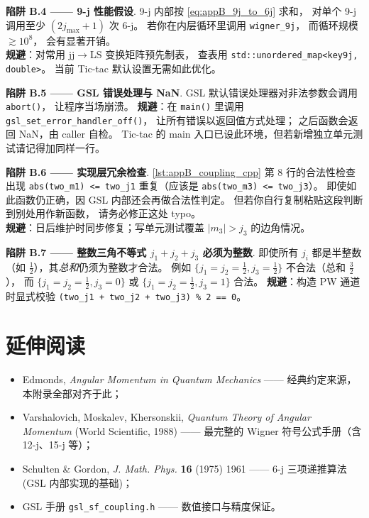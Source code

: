 \begin{pitfallbox}
\textbf{陷阱 B.4 —— 9-j 性能假设}.
9-j 内部按 \cref{eq:appB_9j_to_6j} 求和，
对单个 9-j 调用至少 $(2 j_{\mathrm{max}}+1)$ 次 6-j。
若你在内层循环里调用 \texttt{wigner\_9j}，
而循环规模 $\gtrsim 10^{8}$，
会有显著开销。\\
\textbf{规避}：对常用 jj$\to$LS 变换矩阵预先制表，
查表用 \texttt{std::unordered\_map<key9j, double>}。
当前 Tic-tac 默认设置无需如此优化。
\end{pitfallbox}

\begin{pitfallbox}
\textbf{陷阱 B.5 —— GSL 错误处理与 NaN}.
GSL 默认错误处理器对非法参数会调用 \texttt{abort()}，
让程序当场崩溃。
\textbf{规避}：在 \texttt{main()} 里调用 \texttt{gsl\_set\_error\_handler\_off()}，
让所有错误以返回值方式处理；
之后函数会返回 NaN，由 caller 自检。
Tic-tac 的 main 入口已设此环境，但若新增独立单元测试请记得加同样一行。
\end{pitfallbox}

\begin{pitfallbox}
\textbf{陷阱 B.6 —— 实现层冗余检查}.
\cref{lst:appB_coupling_cpp} 第 8 行的合法性检查
出现 \texttt{abs(two\_m1) <= two\_j1} 重复（应该是 \texttt{abs(two\_m3) <= two\_j3}）。
即使如此函数仍正确，因 GSL 内部还会再做合法性判定。
但若你自行复制粘贴这段判断到别处用作新函数，
请务必修正这处 typo。\\
\textbf{规避}：日后维护时同步修复；写单元测试覆盖 $|m_3| > j_3$ 的边角情况。
\end{pitfallbox}

\begin{pitfallbox}
\textbf{陷阱 B.7 —— 整数三角不等式 $j_1 + j_2 + j_3$ 必须为整数}.
即使所有 $j_i$ 都是半整数（如 $\tfrac{1}{2}$），其\emph{总和}仍须为整数才合法。
例如 $\{j_1=j_2=\tfrac{1}{2}, j_3=\tfrac{1}{2}\}$ 不合法（总和 $\tfrac{3}{2}$），
而 $\{j_1=j_2=\tfrac{1}{2}, j_3=0\}$ 或 $\{j_1=j_2=\tfrac{1}{2}, j_3=1\}$ 合法。
\textbf{规避}：构造 PW 通道时显式校验
\texttt{(two\_j1 + two\_j2 + two\_j3) \% 2 == 0}。
\end{pitfallbox}

\section{延伸阅读}
\label{sec:appB_further_reading}

\begin{itemize}
\item Edmonds, \emph{Angular Momentum in Quantum Mechanics}\cite{Edmonds1957} ——
      经典约定来源，本附录全部对齐于此；
\item Varshalovich, Moskalev, Khersonskii, \emph{Quantum Theory of Angular Momentum}
      (World Scientific, 1988) —— 最完整的 Wigner 符号公式手册（含 12-j、15-j 等）；
\item Schulten \& Gordon, \emph{J. Math. Phys.} \textbf{16} (1975) 1961
      —— 6-j 三项递推算法 (GSL 内部实现的基础)；
\item GSL 手册 \texttt{gsl\_sf\_coupling.h} —— 数值接口与精度保证。
\end{itemize}

